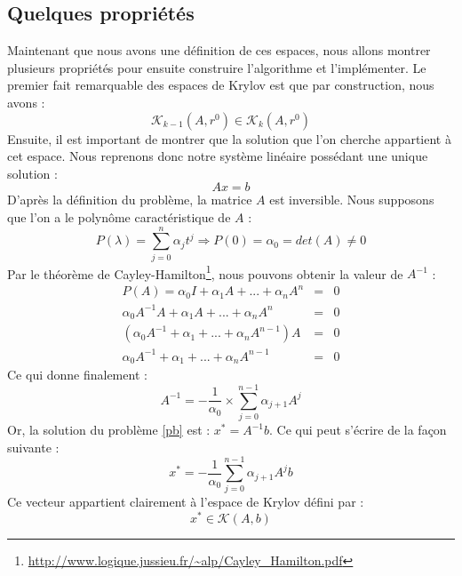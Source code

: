 \subsection{Quelques propriétés}
Maintenant que nous avons une définition de ces espaces, nous allons montrer plusieurs propriétés pour ensuite construire l'algorithme et l'implémenter. Le premier fait remarquable des espaces de Krylov est que par construction, nous avons :  
\begin{equation}
\mathcal{K}_{k - 1}(A, r^0) \in \mathcal{K}_k(A, r^0)
\end{equation}
Ensuite, il est important de montrer que la solution que l'on cherche appartient à cet espace. Nous reprenons donc notre système linéaire possédant une unique solution : 
\begin{equation}
Ax = b \label{pb}
\end{equation}
D'après la définition du problème, la matrice $A$ est inversible. Nous supposons que l'on a le polynôme caractéristique de $A$ :
\begin{equation}
P(\lambda) = \sum_{j = 0}^{n} \alpha_j t^j \Rightarrow P(0) = \alpha_0 = det(A) \neq 0
\end{equation}
Par le théorème de Cayley-Hamilton\footnote{\url{http://www.logique.jussieu.fr/\~alp/Cayley\_Hamilton.pdf}}, nous pouvons obtenir la valeur de $A^{-1}$ :
\begin{eqnarray}
P(A) = \alpha_0 I + \alpha_1 A + ... + \alpha_n A^n &=& 0 \\
\alpha_0 A^{-1}A + \alpha_1 A + ... + \alpha_n A^n &=& 0 \\
(\alpha_0 A^{-1} + \alpha_1  + ... + \alpha_n A^{n - 1})A &=& 0 \\
\alpha_0 A^{-1} + \alpha_1  + ... + \alpha_n A^{n - 1} &=& 0
\end{eqnarray}
Ce qui donne finalement :
\begin{equation}
A^{-1} = - \frac{1}{\alpha_0} \times \sum_{j=0}^{n-1} \alpha_{j+1} A^j
\end{equation}
Or, la solution du problème \ref{pb} est : $x^* = A^{-1}b$. Ce qui peut s'écrire de la façon suivante : 
\begin{equation}
x^* = - \frac{1}{\alpha_0} \sum_{j=0}^{n-1} \alpha_{j+1} A^j b
\end{equation}
Ce vecteur appartient clairement à l'espace de Krylov défini par : 
\begin{equation}
x^* \in \mathcal{K}(A, b)
\end{equation}
